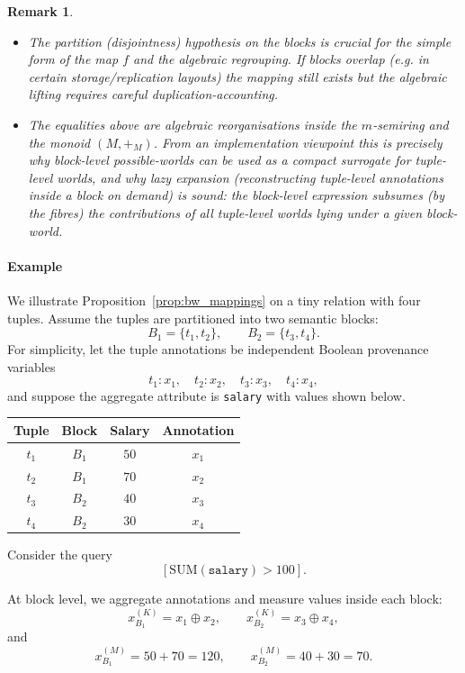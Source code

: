 \documentclass[10pt,a4paper]{scrartcl}
\newtheorem*{remark}{Remark}
\theoremstyle{definition}
\theoremstyle{remark}
\begin{document}
 \begin{remark}

 \begin{itemize}
   \item The partition (disjointness) hypothesis on the blocks is crucial for the simple form of the map $f$ and the algebraic regrouping. If blocks overlap (e.g. in certain storage/replication layouts) the mapping still exists but the algebraic lifting requires careful duplication-accounting.
   \item The equalities above are algebraic reorganisations inside the $m$-semiring and the monoid $(M,+_M)$. From an implementation viewpoint this is precisely why block-level possible-worlds can be used as a compact surrogate for tuple-level worlds, and why lazy expansion (reconstructing tuple-level annotations inside a block on demand) is sound: the block-level expression subsumes (by the fibres) the contributions of all tuple-level worlds lying under a given block-world.
 \end{itemize}
 \end{remark}

\paragraph{Example}
We illustrate Proposition~\ref{prop:bw_mappings} on a tiny relation with four tuples.  
Assume the tuples are partitioned into two semantic blocks:
\[
B_1=\{t_1,t_2\}, \qquad B_2=\{t_3,t_4\}.
\]
For simplicity, let the tuple annotations be independent Boolean provenance variables
\[
t_1:x_1,\quad t_2:x_2,\quad t_3:x_3,\quad t_4:x_4,
\]
and suppose the aggregate attribute is \texttt{salary} with values shown below.

\begin{center}
\begin{tabular}{cccc}
\toprule
Tuple & Block & Salary & Annotation \\
\midrule
$t_1$ & $B_1$ & $50$ & $x_1$ \\
$t_2$ & $B_1$ & $70$ & $x_2$ \\
$t_3$ & $B_2$ & $40$ & $x_3$ \\
$t_4$ & $B_2$ & $30$ & $x_4$ \\
\bottomrule
\end{tabular}
\end{center}

Consider the query
\[
[\mathrm{SUM}(\texttt{salary}) > 100].
\]

At block level, we aggregate annotations and measure values inside each block:
\[
x^{(K)}_{B_1}=x_1 \oplus x_2,\qquad x^{(K)}_{B_2}=x_3 \oplus x_4,
\]
and
\[
x^{(M)}_{B_1}=50+70=120,\qquad x^{(M)}_{B_2}=40+30=70.
\]
\end{document}
